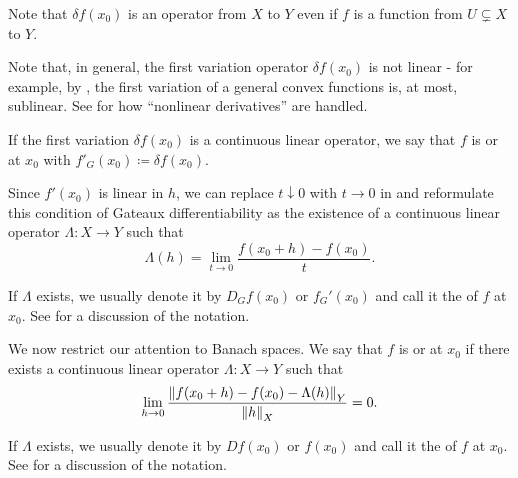 \begin{definition}
\begin{defenum}
    Note that \( \delta f(x_0) \) is an operator from \( X \) to \( Y \) even if \( f \) is a function from \( U \subsetneq X \) to \( Y \).

    Note that, in general, the first variation operator \( \delta f(x_0) \) is not linear - for example, by , the first variation of a general convex functions is, at most, sublinear. See  for how \enquote{nonlinear derivatives} are handled.

    \cite[section 0.2.1]{Йоффе1974} If the first variation \( \delta f(x_0) \) is a continuous linear operator, we say that \( f \) is  or  at \( x_0 \) with  \( f'_G(x_0) \coloneqq \delta f(x_0) \).

    Since \( f'(x_0) \) is linear in \( h \), we can replace \( t \downarrow 0 \) with \( t \to 0 \) in  and reformulate this condition of Gateaux differentiability as the existence of a continuous linear operator \( \Lambda: X \to Y \) such that
    \begin{equation}\label{def:differentiability/gateaux/condition}
      \Lambda(h) = \lim_{t \to 0} \frac {f(x_0 + h) - f(x_0)} t.
    \end{equation}

    If \( \Lambda \) exists, we usually denote it by \( D_G f(x_0) \) or \( f_G'(x_0) \) and call it the  of \( f \) at \( x_0 \). See  for a discussion of the notation.

    \cite[section 0.2.1]{Йоффе1974} We now restrict our attention to Banach spaces. We say that \( f \) is  or  at \( x_0 \) if there exists a continuous linear operator \( \Lambda: X \to Y \) such that
    \begin{equation}\label{def:differentiability/frechet/condition}
      \lim_{h \to 0} \frac {\left\Vert f(x_0 + h) - f(x_0) - \Lambda(h) \right\Vert_Y} {\left\Vert h \right\Vert_X} = 0.
    \end{equation}

    If \( \Lambda \) exists, we usually denote it by \( D f(x_0) \) or \( f(x_0) \) and call it the  of \( f \) at \( x_0 \). See  for a discussion of the notation.


\end{defenum}
\end{definition}

